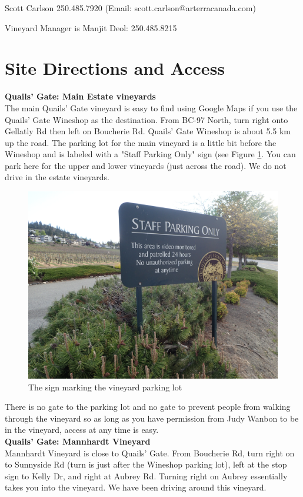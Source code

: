 \documentclass[11pt,letter]{article}
\begin{document}
Scott Carlson 250.485.7920 (Email: scott.carlson@arterracanada.com)

Vineyard Manager is Manjit Deol: 250.485.8215


\section{Site Directions and Access}

{\bf Quails' Gate: Main Estate vineyards} \\
The main Quails' Gate vineyard is easy to find using Google Maps if you use the Quails' Gate Wineshop as the destination. 
From BC-97 North, turn right onto Gellatly Rd then left on Boucherie Rd. Quails' Gate Wineshop is about 5.5 km up the road. The parking lot for the main vineyard is a little bit before the Wineshop and is labeled with a "Staff Parking Only" sign (see Figure \ref{fig:QGparkingLot}. You can park here for the upper and lower vineyards (just across the road). We do not drive in the estate vineyards.

\begin{figure} [h]
  \includegraphics[scale = .25]{qgParkingLot.JPG}
  \caption{The sign marking the vineyard parking lot }
  \label{fig:QGparkingLot}
\end{figure}

There is no gate to the parking lot and no gate to prevent people from walking through the vineyard so as long as you have permission from Judy Wanbon to be in the vineyard, access at any time is easy. \\

{\bf Quails' Gate: Mannhardt Vineyard} \\
Mannhardt Vineyard is close to Quails' Gate. From Boucherie Rd, turn right on to Sunnyside Rd (turn is just after the Wineshop parking lot), left at the stop sign to Kelly Dr, and right at Aubrey Rd. Turning right on Aubrey essentially takes you into the vineyard. We have been driving around this vineyard.
\end{document}
